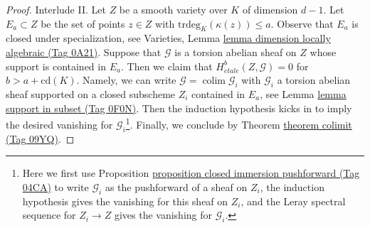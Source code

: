\documentclass{amsart}
\theoremstyle{plain}
\theoremstyle{definition}
\theoremstyle{remark}
\numberwithin{equation}{subsection}
\def\colim{\mathop{\mathrm{colim}}\nolimits}
\def\etale{{\acute{e}tale}}
\begin{document}
\begin{proof}
\medskip\noindent
Interlude II. Let $Z$ be a smooth variety over $K$ of dimension $d - 1$.
Let $E_a \subset Z$ be the set of points $z \in Z$ with
$\text{trdeg}_K(\kappa(z)) \leq a$. Observe that $E_a$ is closed
under specialization, see
Varieties, Lemma \href{https://stacks.math.columbia.edu/tag/0A21}{lemma dimension locally algebraic (Tag 0A21)}.
Suppose that $\mathcal{G}$ is a torsion abelian sheaf on $Z$
whose support is contained in $E_a$. Then we claim that
$H^b_\etale(Z, \mathcal{G}) = 0$ for $b > a + \text{cd}(K)$.
Namely, we can write $\mathcal{G} = \colim \mathcal{G}_i$
with $\mathcal{G}_i$ a torsion abelian sheaf
supported on a closed subscheme $Z_i$ contained in $E_a$, see
Lemma \href{https://stacks.math.columbia.edu/tag/0F0N}{lemma support in subset (Tag 0F0N)}.
Then the induction hypothesis kicks in to imply
the desired vanishing for $\mathcal{G}_i$\footnote{Here
we first use Proposition \href{https://stacks.math.columbia.edu/tag/04CA}{proposition closed immersion pushforward (Tag 04CA)}
to write $\mathcal{G}_i$ as the pushforward of a sheaf on $Z_i$,
the induction hypothesis gives the vanishing for this sheaf on $Z_i$, and
the Leray spectral sequence for $Z_i \to Z$ gives the vanishing
for $\mathcal{G}_i$.}. Finally, we
conclude by Theorem \href{https://stacks.math.columbia.edu/tag/09YQ}{theorem colimit (Tag 09YQ)}.


\end{proof}
\end{document}
